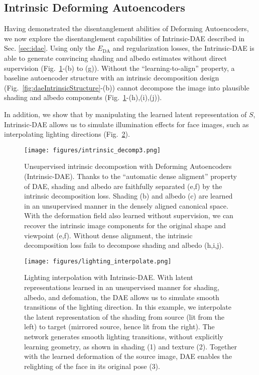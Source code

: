 \documentclass[runningheads]{llncs}
\begin{document}
\subsection{Intrinsic Deforming Autoencoders}
Having demonstrated the disentanglement abilities of Deforming Autoencoders, we now  explore the disentanglement capabilities of Intrinsic-DAE described in Sec. \ref{sec:idae}. 
Using only the $E_{\text{DA}}$ and regularization losses, the Intrinsic-DAE is able to generate convincing shading and albedo estimates without direct supervision (Fig.~\ref{fig:intrinsicDecomp}-(b) to (g)).
Without the ``learning-to-align'' property, a baseline autoencoder structure with an intrinsic decomposition design (Fig.~\ref{fig:daeIntrinsicStructure}-(b)) cannot decompose the image into plausible shading and albedo components (Fig.~\ref{fig:intrinsicDecomp}-(h),(i),(j)).

In addition, we show that by manipulating the learned latent representation of $S$, Intrinsic-DAE allows us to simulate illumination effects for face images, such as interpolating lighting directions (Fig.~\ref{fig:lightingInterpolation}).

\begin{figure}[ht!]
    \centering
    \texttt{[image: figures/intrinsic\_decomp3.png]}
    \caption{Unsupervised intrinsic decompostion with Deforming Autoencoders (Intrinsic-DAE). Thanks to the ``automatic dense aligment'' property of DAE, shading and albedo are faithfully separated (e,f) by the intrinsic decomposition loss. Shading (b) and albedo (c) are learned in an unsupervised manner in the densely aligned canonical space. With the  deformation field also learned  without supervision, we can recover the intrinsic image components for the original shape and viewpoint (e,f). Without dense alignment, the intrinsic decomposition loss fails to decompose shading and albedo (h,i,j).}
    \label{fig:intrinsicDecomp}
\end{figure}

\begin{figure}[ht!]
    \centering
    \texttt{[image: figures/lighting\_interpolate.png]}
    \caption{Lighting interpolation with Intrinsic-DAE. With latent representations learned in an unsupervised manner for shading, albedo, and defomation, the DAE allows us to simulate smooth transitions of the lighting direction. In this example, we interpolate the latent representation of the shading from source (lit from the left) to target (mirrored source, hence lit from the right). The network generates smooth lighting transitions, without explicitly learning geometry, as shown in shading (1) and texture (2). Together with the  learned deformation of the source image, DAE enables the relighting of the face in its original pose (3).}
    \label{fig:lightingInterpolation}
\end{figure}
\end{document}
